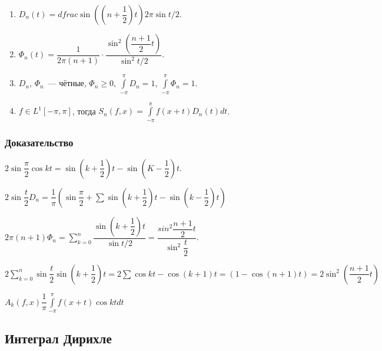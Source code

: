 \documentclass{article}
\begin{document}
        \begin{enumerate}
        
            \item $D_n(t) = dfrac{\sin \left( \left(n + \dfrac{1}{2} \right) t \right)}{2 \pi \sin {t / 2}}$.
            
            \item $\Phi_n(t) = \dfrac{1}{2 \pi (n + 1)} \cdot \dfrac{\sin^2 \left( \dfrac{n + 1}{2} t \right)}{\sin^2 {t / 2}}$.
            
            \item $D_n$, $\Phi_n$~--- чётные, $\Phi_n \geqslant 0$, $\int\limits^{\pi}_{-\pi} D_n = 1$, $\int\limits^{\pi}_{-\pi} \Phi_n = 1$.
            
            \item $f \in L^1 [-\pi, \pi]$, тогда $S_n(f, x) = \int\limits_{-\pi}^{\pi} f(x + t) D_n(t) dt$.
            
        \end{enumerate}
    
        \subsubsection{Доказательство}
        
            $2 \sin \dfrac{\pi}{2} \cos {kt} = \sin \left(k + \dfrac{1}{2} \right) t - \sin \left( K - \dfrac{1}{2} \right) t$.
            
            $2 \sin \dfrac{t}{2} D_n = \dfrac{1}{\pi} \left( \sin \dfrac{\pi}{2} + \sum \sin \left(k + \dfrac{1}{2} \right) t - \sin \left( k - \dfrac{1}{2} \right) t \right)$
        
            $2 \pi (n + 1) \Phi_n = \sum\limits_{k = 0}^n \dfrac{\sin \left(k + \dfrac{1}{2} \right) t}{\sin {t / 2}} = \dfrac{sin^2 \dfrac{n + 1}{2} t }{\sin^2 \dfrac{t}{2}}$.
            
            $2 \sum\limits_{k = 0}^n \sin \dfrac{t}{2} \sin \left( k + \dfrac{1}{2} \right) t = 2 \sum \cos {kt} - \cos \left( k + 1 \right) t = (1 - \cos (n + 1) t ) = 2 \sin^2 \left( \dfrac{n + 1}{2} t \right)$
            
            $A_k(f, x) \dfrac{1}{\pi} \int\limits^{\pi}_{-\pi} f(x + t) \cos {kt} dt$
    
    \subsection{Интеграл Дирихле}
    
\end{document}
